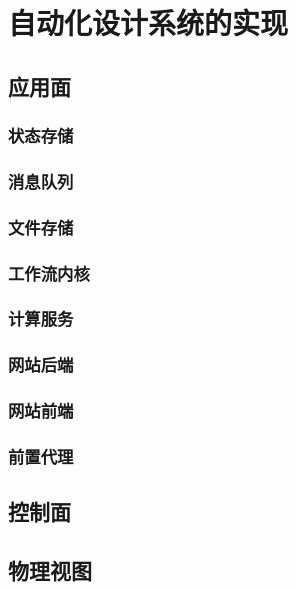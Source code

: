 \documentclass[index]{subfiles}
\begin{document}
\chapter{自动化设计系统的实现}\label{sec:impl}
\section{应用面}
\subsection{状态存储}
\subsection{消息队列}
\subsection{文件存储}
\subsection{工作流内核}
\subsection{计算服务}
\subsection{网站后端}
\subsection{网站前端}
\subsection{前置代理}
\section{控制面}
\section{物理视图}
\end{document}

